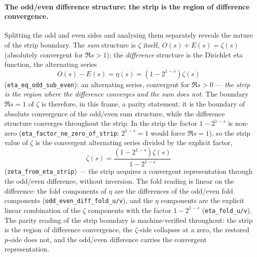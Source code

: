 \documentclass{article}
\newcommand{\zt}{\zeta}
\begin{document}
\paragraph{The odd/even difference structure: the strip is the region of
difference convergence.}
Splitting the odd and even sides and analysing them separately reveals
the nature of the strip boundary. The \emph{sum} structure is $\zt$
itself, $O(s)+E(s)=\zt(s)$ (absolutely convergent for $\Re s>1$); the
\emph{difference} structure is the Dirichlet eta function, the
alternating series
\begin{equation}
  O(s)-E(s)=\eta(s)=(1-2^{1-s})\zt(s)
\end{equation}
(\texttt{eta\_eq\_odd\_sub\_even}): an alternating series, convergent
for $\Re s>0$ --- \emph{the strip is the region where the difference
converges and the sum does not}. The boundary $\Re s=1$ of $\zt$ is
therefore, in this frame, a parity statement: it is the boundary of
absolute convergence of the odd/even sum structure, while the
difference structure converges throughout the strip. In the strip the
factor $1-2^{1-s}$ is non-zero
(\texttt{eta\_factor\_ne\_zero\_of\_strip}: $2^{1-s}=1$ would force
$\Re s=1$), so the strip value of $\zt$ is the convergent alternating
series divided by the explicit factor,
\begin{equation}
  \zt(s)=\frac{(1-2^{1-s})\zt(s)}{1-2^{1-s}}
\end{equation}
(\texttt{zeta\_from\_eta\_strip}) --- the strip acquires a convergent
representation through the odd/even difference, without inversion.
The fold reading is linear on the difference: the fold components of
$\eta$ are the differences of the odd/even fold components
(\texttt{odd\_even\_diff\_fold\_u/v}), and the $\eta$ components are
the explicit linear combination of the $\zt$ components with the
factor $1-2^{1-s}$ (\texttt{eta\_fold\_u/v}). The parity reading of
the strip boundary is machine-verified throughout: the strip is the
region of difference convergence, the $\zt$-side collapses at a zero,
the restored $p$-side does not, and the odd/even difference carries
the convergent representation.
\end{document}
